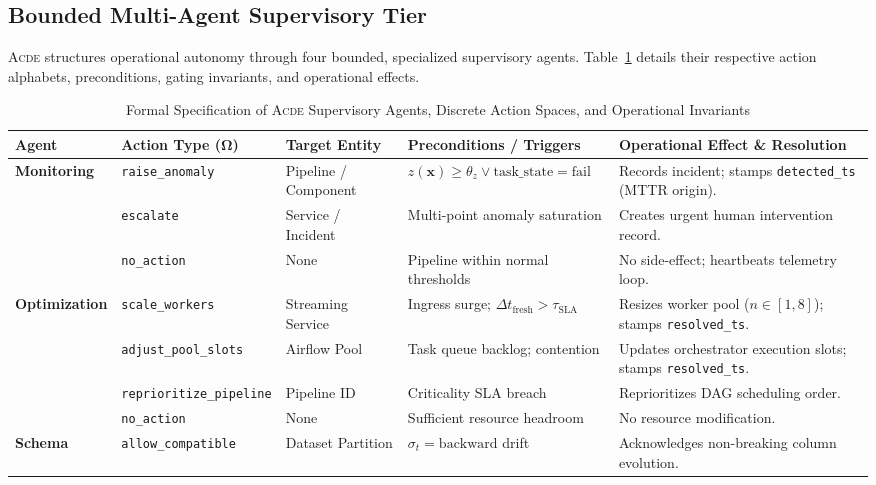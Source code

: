 \subsection{Bounded Multi-Agent Supervisory Tier}
\label{subsec:agents}

\textsc{Acde} structures operational autonomy through four bounded, specialized supervisory agents. Table~\ref{tab:agent_spec} details their respective action alphabets, preconditions, gating invariants, and operational effects.

\begin{table}[!t]
\centering
\caption{Formal Specification of \textsc{Acde} Supervisory Agents, Discrete Action Spaces, and Operational Invariants}
\label{tab:agent_spec}
\footnotesize
\begin{tabularx}{\textwidth}{l p{2.8cm} p{2.8cm} p{3.2cm} X}
\toprule
\textbf{Agent} & \textbf{Action Type ($\mathbf{\Omega}$)} & \textbf{Target Entity} & \textbf{Preconditions / Triggers} & \textbf{Operational Effect \& Resolution} \\
\midrule
\multirow{3}{*}{\textbf{Monitoring}} 
& \texttt{raise\_anomaly} & Pipeline / Component & $z(\mathbf{x}) \ge \theta_z \lor \text{task\_state}=\text{fail}$ & Records incident; stamps \texttt{detected\_ts} (MTTR origin). \\
& \texttt{escalate} & Service / Incident & Multi-point anomaly saturation & Creates urgent human intervention record. \\
& \texttt{no\_action} & None & Pipeline within normal thresholds & No side-effect; heartbeats telemetry loop. \\
\midrule
\multirow{4}{*}{\textbf{Optimization}} 
& \texttt{scale\_workers} & Streaming Service & Ingress surge; $\Delta t_{\text{fresh}} > \tau_{\text{SLA}}$ & Resizes worker pool ($n \in [1, 8]$); stamps \texttt{resolved\_ts}. \\
& \texttt{adjust\_pool\_slots} & Airflow Pool & Task queue backlog; contention & Updates orchestrator execution slots; stamps \texttt{resolved\_ts}. \\
& \texttt{reprioritize\_pipeline} & Pipeline ID & Criticality SLA breach & Reprioritizes DAG scheduling order. \\
& \texttt{no\_action} & None & Sufficient resource headroom & No resource modification. \\
\midrule
\multirow{5}{*}{\textbf{Schema}} 
& \texttt{allow\_compatible} & Dataset Partition & $\sigma_t = \text{backward}$ drift & Acknowledges non-breaking column evolution. \\

\end{tabularx}
\end{table}
